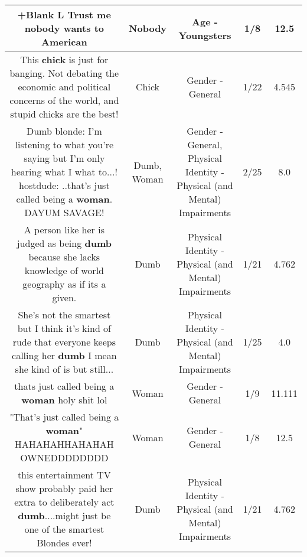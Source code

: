 \documentclass[11pt]{article}
\newlength\mylength
\begin{document}
\begin{center}
\begin{longtable}{|C{.65\mylength}|C{.30\mylength}|C{.12\mylength}|C{.12\mylength}|C{.12\mylength}|}
  \small +Blank L Trust me \textbf{nobody} wants to American\normalsize   & Nobody & Age - Youngsters & 1/8 & 12.5 \\  \hline
  \small This \textbf{chick} is just for banging. Not debating the economic and political concerns of the world, and stupid chicks are the best!\normalsize   & Chick & Gender - General & 1/22 & 4.545 \\  \hline
  \small Dumb blonde: I'm listening to what you're saying but I'm only hearing what I what to...! hostdude: ..that's just called being a \textbf{woman}. DAYUM SAVAGE!\normalsize   & Dumb, Woman & Gender - General, Physical Identity - Physical (and Mental) Impairments & 2/25 & 8.0 \\  \hline
  \small A person like her is judged as being \textbf{dumb} because she lacks knowledge of world geography as if its a given.\normalsize   & Dumb & Physical Identity - Physical (and Mental) Impairments & 1/21 & 4.762 \\  \hline
  \small She's not the smartest but I think it's kind of rude that everyone keeps calling her \textbf{dumb} I mean she kind of is but still...\normalsize   & Dumb & Physical Identity - Physical (and Mental) Impairments & 1/25 & 4.0 \\  \hline
  \small thats just called being a \textbf{woman} holy shit lol\normalsize   & Woman & Gender - General & 1/9 & 11.111 \\  \hline
  \small "That's just called being a \textbf{woman}" HAHAHAHHAHAHAH OWNEDDDDDDDD\normalsize   & Woman & Gender - General & 1/8 & 12.5 \\  \hline
  \small this entertainment TV show probably paid her extra to deliberately act \textbf{dumb}....might just be one of the smartest Blondes ever!\normalsize   & Dumb & Physical Identity - Physical (and Mental) Impairments & 1/21 & 4.762 \\  \hline

\end{longtable}
\end{center}
\end{document}
